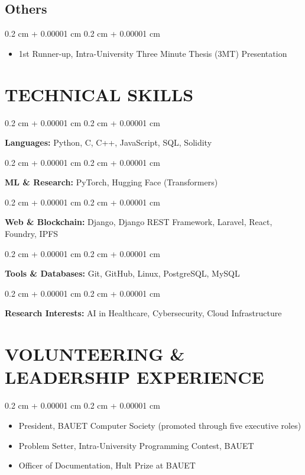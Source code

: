 \documentclass[10pt, a4paper]{article}
\newenvironment{highlights}{
	\begin{itemize}[
		topsep=0.10 cm,
		parsep=0.10 cm,
		partopsep=0pt,
		itemsep=0pt,
		leftmargin=0.4 cm + 10pt
		]
	}{
	\end{itemize}
} %
\newenvironment{onecolentry}{
	\begin{adjustwidth}{
			0.2 cm + 0.00001 cm
		}{
			0.2 cm + 0.00001 cm
		}
	}{
	\end{adjustwidth}
} %
\begin{document}
	
	\subsection{Others}
	
	\begin{onecolentry}
		\begin{highlights}
			\item 1st Runner-up, Intra-University Three Minute Thesis (3MT) Presentation
		\end{highlights}
	\end{onecolentry}
	
	\section{TECHNICAL SKILLS}
	
	
	
	
	\begin{onecolentry}
		\textbf{Languages:} Python, C, C++, JavaScript, SQL, Solidity
	\end{onecolentry}

	\begin{onecolentry}
		\textbf{ML \& Research:} PyTorch, Hugging Face (Transformers)
	\end{onecolentry}

	\begin{onecolentry}
		\textbf{Web \& Blockchain:} Django, Django REST Framework, Laravel, React, Foundry, IPFS
	\end{onecolentry}

	\begin{onecolentry}
		\textbf{Tools \& Databases:} Git, GitHub, Linux, PostgreSQL, MySQL
	\end{onecolentry}

	\begin{onecolentry}
		\textbf{Research Interests:} AI in Healthcare, Cybersecurity, Cloud Infrastructure
	\end{onecolentry}
	
	
	
	
	
\section{VOLUNTEERING \& LEADERSHIP EXPERIENCE}

\begin{onecolentry}
	\begin{highlights}
		\item President, BAUET Computer Society (promoted through five executive roles)
		\item Problem Setter, Intra-University Programming Contest, BAUET
		\item Officer of Documentation, Hult Prize at BAUET
	\end{highlights}
\end{onecolentry}

	

	
	
	
	
\enlargethispage{-9.1pt}%
\end{document}
